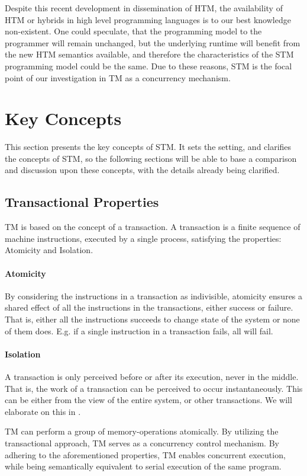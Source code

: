 Despite this recent development in dissemination of \ac{HTM}, the availability of \ac{HTM} or hybrids in high level programming languages is to our best knowledge non-existent. One could speculate, that the programming model to the programmer will remain unchanged, but the underlying runtime will benefit from the new \ac{HTM} semantics available, and therefore the characteristics of the \ac{STM} programming model could be the same. Due to these reasons, \ac{STM} is the focal point of our investigation in \ac{TM} as a concurrency mechanism. 

\section{Key Concepts}
\label{sec:stm_keyconcepts}
This section presents the key concepts of \ac{STM}. It sets the setting, and clarifies the concepts of \ac{STM}, so the following sections will be able to base a comparison and discussion upon these concepts, with the details already being clarified.

\subsection{Transactional Properties}
\ac{TM} is based on the concept of a transaction. A transaction is a finite sequence of machine instructions, executed by a single process, satisfying the properties: Atomicity and Isolation\cite[p. 2]{herlihy2011tm}.

\paragraph{Atomicity} By considering the instructions in a transaction as indivisible, atomicity ensures a shared effect of all the instructions in the transactions, either success or failure. That is, either all the instructions succeeds to change state of the system or none of them does. E.g. if a single instruction in a transaction fails, all will fail.
\paragraph{Isolation} A transaction is only perceived before or after its execution, never in the middle. That is, the work of a transaction can be perceived to occur instantaneously. This can be either from the view of the entire system, or other transactions. We will elaborate on this in .

\ac{TM} can perform a group of memory-operations atomically\cite[48]{harris2005composable}. By utilizing the transactional approach, \ac{TM} serves as a concurrency control mechanism. By adhering to the aforementioned properties, \ac{TM} enables concurrent execution, while being semantically equivalent to serial execution of the same program.

